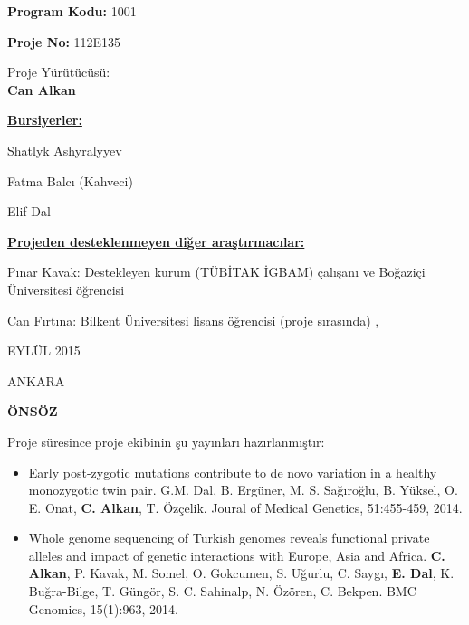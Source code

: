 \documentclass[11pt]{article}
\begin{document}
\bigskip

\bigskip


\thispagestyle{empty}


\begin{center}
\medskip
{\LARGE \textbf{Program Kodu:} 1001}

\bigskip
{\LARGE \textbf{Proje No:} 112E135}

\bigskip
{\LARGE Proje Yürütücüsü:\\
\textbf{Can Alkan}}

\end{center}



\bigskip


\bigskip
\noindent
{\large
\noindent
\underline{\bf Bursiyerler:}

\noindent
Shatlyk Ashyralyyev

\noindent
Fatma Balcı (Kahveci)

\noindent
Elif Dal

\noindent \underline{\bf Projeden desteklenmeyen diğer araştırmacılar:}

\noindent
Pınar Kavak: Destekleyen kurum (TÜBİTAK İGBAM) çalışanı ve Boğaziçi Üniversitesi öğrencisi

\noindent
Can Fırtına: Bilkent Üniversitesi lisans öğrencisi (proje sırasında) ,


}



\bigskip





\begin{center}
{\Large EYLÜL 2015

\vspace{1mm}
ANKARA}
\end{center}


\linespread{1.5}

\newpage\setlength{\parskip}{3mm} 
\onehalfspacing
\bigskip
\setcounter{page}{1}
\begin{center}
{\LARGE \bf ÖNSÖZ}
\end{center}


Proje süresince proje ekibinin şu yayınları hazırlanmıştır: 

\begin{itemize}
\item Early post-zygotic mutations contribute to de novo variation in a healthy monozygotic twin pair. G.M. Dal, B. Ergüner, M. S. Sağıroğlu, B. Yüksel, O. E. Onat, {\bf C. Alkan}, T. Özçelik. Joural of Medical Genetics, 51:455-459, 2014.
\item Whole genome sequencing of Turkish genomes reveals functional private alleles and impact of genetic interactions with Europe, Asia and Africa. {\bf C. Alkan}, P.  Kavak, M. Somel, O. Gokcumen, 
  S. Uğurlu, C. Saygı, {\bf E. Dal}, K. Buğra-Bilge,  T. Güngör, S. C. Sahinalp, N. Özören, C. Bekpen. BMC Genomics, 15(1):963, 2014.
\end{itemize}
\end{document}
